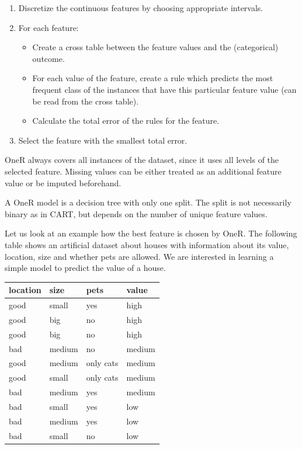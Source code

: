 \documentclass[
  11pt,
]{scrbook}
\providecommand{\tightlist}{%
  \setlength{\itemsep}{0pt}\setlength{\parskip}{0pt}}
\begin{document}
\begin{enumerate}
\def\labelenumi{\arabic{enumi}.}
\tightlist
\item
  Discretize the continuous features by choosing appropriate intervals.
\item
  For each feature:

  \begin{itemize}
  \tightlist
  \item
    Create a cross table between the feature values and the (categorical) outcome.
  \item
    For each value of the feature, create a rule which predicts the most frequent class of the instances that have this particular feature value (can be read from the cross table).
  \item
    Calculate the total error of the rules for the feature.
  \end{itemize}
\item
  Select the feature with the smallest total error.
\end{enumerate}

OneR always covers all instances of the dataset, since it uses all levels of the selected feature.
Missing values can be either treated as an additional feature value or be imputed beforehand.

A OneR model is a decision tree with only one split.
The split is not necessarily binary as in CART, but depends on the number of unique feature values.

Let us look at an example how the best feature is chosen by OneR.
The following table shows an artificial dataset about houses with information about its value, location, size and whether pets are allowed.
We are interested in learning a simple model to predict the value of a house.

\begin{table}
\centering
\begin{tabular}{llll}
\toprule
location & size & pets & value\\
\midrule
good & small & yes & high\\
good & big & no & high\\
good & big & no & high\\
bad & medium & no & medium\\
good & medium & only cats & medium\\
\addlinespace
good & small & only cats & medium\\
bad & medium & yes & medium\\
bad & small & yes & low\\
bad & medium & yes & low\\
bad & small & no & low\\
\bottomrule
\end{tabular}
\end{table}
\end{document}
